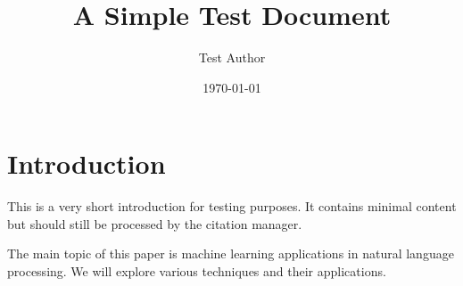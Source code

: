 \documentclass{article}
\title{A Simple Test Document}
\author{Test Author}
\date{\today}
\begin{document}
\maketitle

\section{Introduction}
This is a very short introduction for testing purposes. It contains minimal content but should still be processed by the citation manager.

The main topic of this paper is machine learning applications in natural language processing. We will explore various techniques and their applications.
\end{document}
